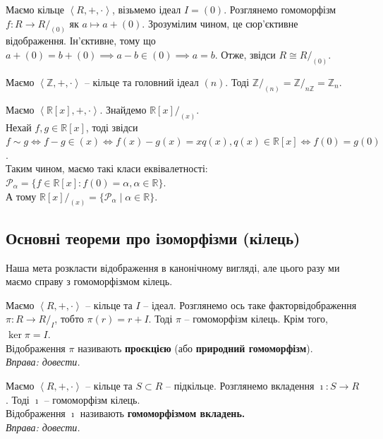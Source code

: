 \documentclass{math_library}
\begin{document}
\begin{example}
Маємо кільце $\left<R,+,\cdot \right>$, візьмемо ідеал $I = (0)$. Розглянемо гомоморфізм $f \colon R \to R/_{(0)}$ як $a \mapsto a + (0)$. Зрозумілим чином, це сюр'єктивне відображення. Ін'єктивне, тому що $a + (0) = b + (0) \implies a - b \in (0) \implies a = b$. Отже, звідси $R \cong R/_{(0)}$.
\end{example}

\begin{example}
Маємо $\left< \mathbb{Z},+,\cdot \right>$ -- кільце та головний ідеал $(n)$. Тоді $\mathbb{Z}/_{(n)} = \mathbb{Z}/_{n\mathbb{Z}} = \mathbb{Z}_n$.
\end{example}

\begin{example}
Маємо $\left< \mathbb{R}[x],+,\cdot \right>$. Знайдемо $\mathbb{R}[x]/_{(x)}$.\\
Нехай $f,g \in \mathbb{R}[x]$, тоді звідси\\
$f \sim g \iff f - g \in (x) \iff f(x)-g(x) = x q(x), q(x) \in \mathbb{R}[x] \iff f(0) = g(0)$.\\
Таким чином, маємо такі класи еквівалетності:\\
$\mathcal{P}_\alpha = \{f \in \mathbb{R}[x]: f(0) = \alpha, \alpha \in \mathbb{R} \}$.\\
А тому $\mathbb{R}[x]/_{(x)} = \{ \mathcal{P}_\alpha \mid \alpha \in \mathbb{R} \}$.
\end{example}

\subsection{Основні теореми про ізоморфізми (кілець)}
Наша мета розкласти відображення в канонічному вигляді, але цього разу ми маємо справу з гомоморфізмом кілець.
\begin{lemma}
Маємо $\left< R, + ,\cdot \right>$ -- кільце та $I$ -- ідеал. Розглянемо ось таке факторвідображення $\pi \colon R \to R/_{I}$, тобто $\pi(r) = r + I$. Тоді $\pi$ -- гомоморфізм кілець. Крім того, $\ker \pi = I$.\\
Відображення $\pi$ називають \textbf{проєкцією} (або \textbf{природний гомоморфізм}).\\
\textit{Вправа: довести.}
\end{lemma}

\begin{lemma}
Маємо $\left<R, +, \cdot \right>$ -- кільце та $S \subset R$ -- підкільце. Розглянемо вкладення $\imath \colon S \to R$. Тоді $\imath$ -- гомоморфізм кілець.\\
Відображення $\imath$ називають \textbf{гомоморфізмом вкладень.}\\
\textit{Вправа: довести.}
\end{lemma}
\end{document}
